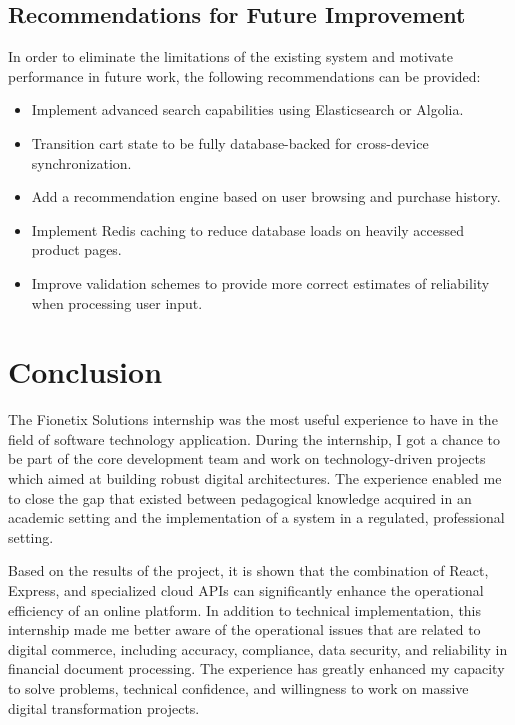 \documentclass[12pt,a4paper]{report}
\begin{document}
\section{Recommendations for Future Improvement}
In order to eliminate the limitations of the existing system and motivate performance in future work, the following recommendations can be provided:
\begin{itemize}
    \item Implement advanced search capabilities using Elasticsearch or Algolia.
    \item Transition cart state to be fully database-backed for cross-device synchronization.
    \item Add a recommendation engine based on user browsing and purchase history.
    \item Implement Redis caching to reduce database loads on heavily accessed product pages.
    \item Improve validation schemes to provide more correct estimates of reliability when processing user input.
\end{itemize}


\chapter{Conclusion}
The Fionetix Solutions internship was the most useful experience to have in the field of software technology application. During the internship, I got a chance to be part of the core development team and work on technology-driven projects which aimed at building robust digital architectures. The experience enabled me to close the gap that existed between pedagogical knowledge acquired in an academic setting and the implementation of a system in a regulated, professional setting.

Based on the results of the project, it is shown that the combination of React, Express, and specialized cloud APIs can significantly enhance the operational efficiency of an online platform. In addition to technical implementation, this internship made me better aware of the operational issues that are related to digital commerce, including accuracy, compliance, data security, and reliability in financial document processing. The experience has greatly enhanced my capacity to solve problems, technical confidence, and willingness to work on massive digital transformation projects.
\end{document}

